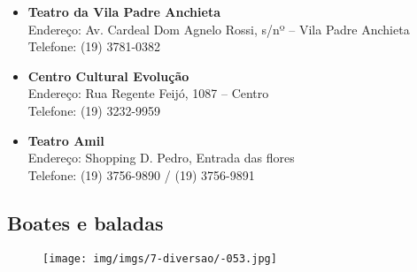 \begin{itemize}
\item   \textbf{Teatro da Vila Padre Anchieta}
		\\Endereço: Av. Cardeal Dom Agnelo Rossi, s/nº -- Vila Padre Anchieta
		\\Telefone: (19) 3781-0382

\item   \textbf{Centro Cultural Evolução}
		\\Endereço: Rua Regente Feijó, 1087 -- Centro
		\\Telefone: (19) 3232-9959

\item   \textbf{Teatro Amil}
		\\Endereço: Shopping D. Pedro, Entrada das flores
		\\Telefone: (19) 3756-9890 / (19) 3756-9891

\end{itemize}

\subsection{Boates e baladas}

\begin{figure}[hb!]
    \centering
    \texttt{[image: img/imgs/7-diversao/-053.jpg]}
\end{figure}


